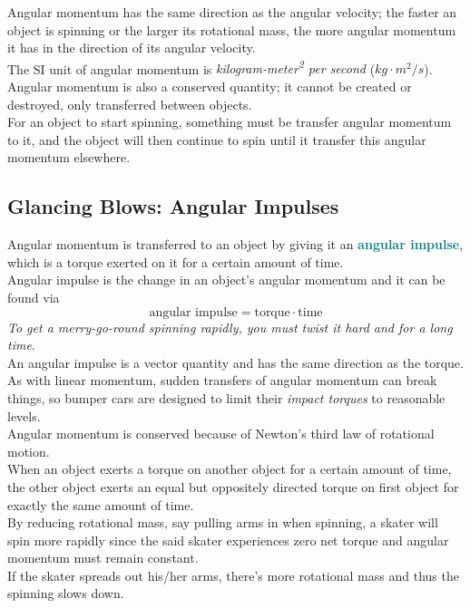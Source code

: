 \documentclass[12pt]{article}
\theoremstyle{definition}
\newcommand{\defnterm}[1]{\textbf{\textcolor{teal}{#1}}\index{#1}}
\begin{document}
Angular momentum has the same direction as the angular velocity;
the faster an object is spinning or the larger its rotational mass, the more angular momentum it has in the direction of its angular velocity. \\
The SI unit of angular momentum is \emph{kilogram-meter\textsuperscript{2} per second} ($kg \cdot m^{2} / s$). \\

Angular momentum is also a conserved quantity;
it cannot be created or destroyed, only transferred between objects. \\
For an object to start spinning, something must be transfer angular momentum to it, and the object will then continue to spin until it transfer this angular momentum elsewhere.

\subsection{Glancing Blows: Angular Impulses}
Angular momentum is transferred to an object by giving it an \defnterm{angular impulse}, which is a torque exerted on it for a certain amount of time. \\
Angular impulse is the change in an object's angular momentum and it can be found via
$$\text{angular impulse} = \text{torque} \cdot \text{time}$$
\emph{To get a merry-go-round spinning rapidly, you must twist it hard and for a long time}. \\

An angular impulse is a vector quantity and has the same direction as the torque. \\
As with linear momentum, sudden transfers of angular momentum can break things, so bumper cars are designed to limit their \emph{impact torques} to reasonable levels. \\

Angular momentum is conserved because of Newton's third law of rotational motion. \\
When an object exerts a torque on another object for a certain amount of time, the other object exerts an equal but oppositely directed torque on first object for exactly the same amount of time. \\

By reducing rotational mass, say pulling arms in when spinning, a skater will spin more rapidly since the said skater experiences zero net torque and angular momentum must remain constant. \\
If the skater spreads out his/her arms, there's more rotational mass and thus the spinning slows down.
\end{document}
